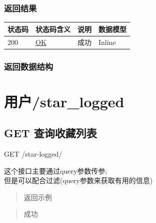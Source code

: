 \documentclass[
]{article}
\begin{document}
\hypertarget{ux8fd4ux56deux7ed3ux679c-27}{%
\subsubsection{返回结果}\label{ux8fd4ux56deux7ed3ux679c-27}}

\begin{longtable}[]{@{}llll@{}}
\toprule
状态码 & 状态码含义 & 说明 & 数据模型 \\
\midrule
\endhead
200 & \href{https://tools.ietf.org/html/rfc7231\#section-6.3.1}{OK} &
成功 & Inline \\
\bottomrule
\end{longtable}

\hypertarget{ux8fd4ux56deux6570ux636eux7ed3ux6784-21}{%
\subsubsection{返回数据结构}\label{ux8fd4ux56deux6570ux636eux7ed3ux6784-21}}

\hypertarget{ux7528ux6237starlogged}{%
\section{用户/star\_logged}\label{ux7528ux6237starlogged}}

\hypertarget{get-ux67e5ux8be2ux6536ux85cfux5217ux8868-1}{%
\subsection{GET
查询收藏列表}\label{get-ux67e5ux8be2ux6536ux85cfux5217ux8868-1}}

GET /star-logged/

这个接口主要通过query参数传参;\\
但是可以配合过滤(query参数来获取有用的信息)

\begin{quote}
返回示例
\end{quote}

\begin{quote}
成功
\end{quote}
\end{document}
